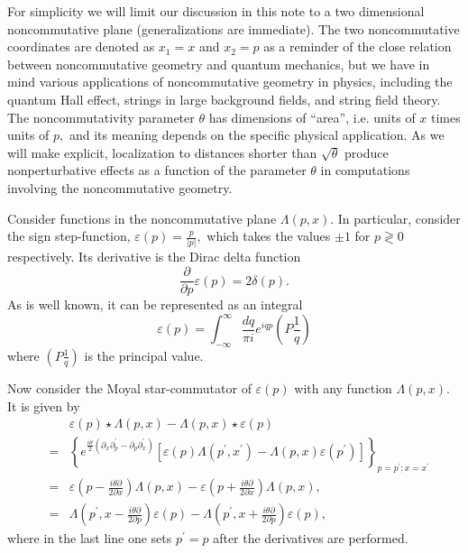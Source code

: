 \documentclass[a4paper,12pt]{article}
\begin{document}
For simplicity we will limit our discussion in this note to a two
dimensional noncommutative plane (generalizations are immediate). The two
noncommutative coordinates are denoted as $x_{1}=x$ and $x_{2}=p$ as a
reminder of the close relation between noncommutative geometry and quantum
mechanics, but we have in mind various applications of noncommutative
geometry in physics, including the quantum Hall effect, strings in large
background fields, and string field theory. The noncommutativity parameter $%
\theta $ has dimensions of ``area'', i.e. units of $x$ times units of $p,$
and its meaning depends on the specific physical application. As we will
make explicit, localization to distances shorter than $\sqrt{\theta }$
produce nonperturbative effects as a function of the parameter $\theta $ in
computations involving the noncommutative geometry.

Consider functions in the noncommutative plane $\Lambda \left( p,x\right) .$
In particular, consider the sign step-function, $\varepsilon \left( p\right)
=\frac{p}{\left| p\right| },$ which takes the values $\pm 1$ for $p\gtrless
0 $ respectively. Its derivative is the Dirac delta function
\begin{equation}
\frac{\partial }{\partial p}\varepsilon \left( p\right) =2\delta \left(
p\right) .
\end{equation}
As is well known, it can be represented as an integral
\begin{equation}
\varepsilon \left( p\right) =\int_{-\infty }^{\infty }\frac{dq}{\pi i}%
e^{iqp}\left( P\frac{1}{q}\right)
\end{equation}
where $\left( P\frac{1}{q}\right) $ is the principal value.

Now consider the Moyal star-commutator of $\varepsilon \left( p\right) $
with any function $\Lambda \left( p,x\right) $. It is given by
\begin{eqnarray}
&&\varepsilon \left( p\right) \star \Lambda \left( p,x\right) -\Lambda
\left( p,x\right) \star \varepsilon \left( p\right) \\
&=&\left\{ e^{\frac{i\theta }{2}\left( \partial _{x}\partial _{p}^{\prime
}-\partial _{p}\partial _{x}^{\prime }\right) }\left[ \varepsilon \left(
p\right) \Lambda \left( p^{\prime },x^{\prime }\right) -\Lambda \left(
p,x\right) \varepsilon \left( p^{\prime }\right) \right] \right\}
_{p=p^{\prime };x=x^{\prime }}  \label{moyal} \\
&=&\varepsilon \left( p-\frac{i\theta \partial }{2\partial x}\right) \Lambda
\left( p,x\right) -\varepsilon \left( p+\frac{i\theta \partial }{2\partial x}%
\right) \Lambda \left( p,x\right) ,  \label{first} \\
&=&\Lambda \left( p^{\prime },x-\frac{i\theta \partial }{2\partial p}\right)
\varepsilon \left( p\right) -\Lambda \left( p^{\prime },x+\frac{i\theta
\partial }{2\partial p}\right) \varepsilon \left( p\right) ,  \label{second}
\end{eqnarray}
where in the last line one sets $p^{\prime }=p$ after the derivatives are
performed.
\end{document}
